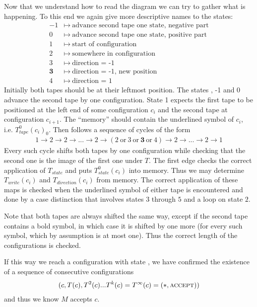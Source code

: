 	Now that we understand how to read the diagram we can try to gather what is happening. To this end we again give more descriptive names to the states:
	\begin{align*}
		-1 &\mapsto~\text{advance second tape one state, negative part} \\
		0 &\mapsto~\text{advance second tape one state, positive part} \\
		1 &\mapsto~\text{start of configuration} \\
		2 &\mapsto~\text{somewhere in configuration} \\
		3 &\mapsto~\text{direction = -1} \\
		\textbf{3} &\mapsto~\text{direction = -1, new position} \\
		4 &\mapsto~\text{direction = 1}
	\end{align*}
	Initially both tapes should be at their leftmost position.
	The states \INI, -1 and 0 advance the second tape by one configuration.
	State 1 expects the first tape to be positioned at the left end of some configuration $c_i$ and the second tape at configuration $c_{i+1}$.
	The ``memory'' should contain the underlined symbol of $c_i$, i.e. $T_{tape}^0(c_i)_0$.
	Then follows a sequence of cycles of the form
	\begin{align*}
		1 \to 2 \to 2 \to ... \to 2 \to (2~\text{or}~3~\text{or}~\textbf{3}~\text{or}~4) \to 2 \to ... \to 2 \to 1
	\end{align*}
	Every such cycle shifts both tapes by one configuration while checking that the second one is the image of the first one under $T$.
	The first edge  checks the correct application of $T_{state}$ and puts $T_{state}^0(c_i)$ into memory.
	Thus we may determine $T_{write}(c_i)$ and $T_{direction}(c_i)$ from memory.
	The correct application of these maps is checked when the underlined symbol of either tape is encountered and done by a case distinction that involves states $3$ through $5$ and a loop on state $2$.

	Note that both tapes are always shifted the same way, except if the second tape contains a bold symbol, in which case it is shifted by one more (for every such symbol, which by assumption is at most one).
	Thus the correct length of the configurations is checked.

	If this way we reach a configuration with state \ACC, we have confirmed the existence of a sequence of consecutive configurations
	\begin{align*}
		(c, T(c), T^2(c) ... T^k(c) = T^\infty(c) = (*,\text{\scshape{accept}}))
	\end{align*}
	and thus we know $M$ accepts $c$.

